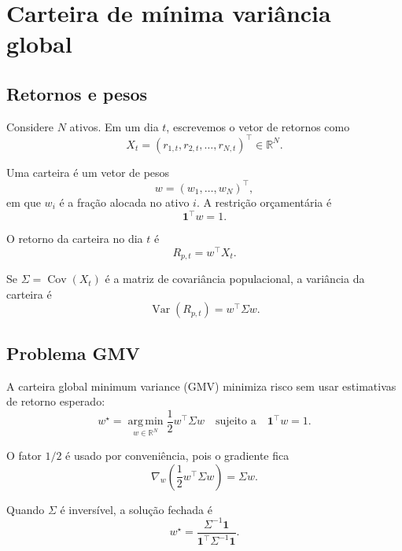 \documentclass[12pt,a4paper]{article}
\newcommand{\R}{\mathbb{R}}
\newcommand{\Var}{\operatorname{Var}}
\newcommand{\Cov}{\operatorname{Cov}}
\newcommand{\argmin}{\operatorname*{arg\,min}}
\newcommand{\one}{\mathbf{1}}
\begin{document}
\section{Carteira de mínima variância global}

\subsection{Retornos e pesos}

Considere $N$ ativos. Em um dia $t$, escrevemos o vetor de retornos como
\begin{equation}
  X_t = (r_{1,t}, r_{2,t}, \dots, r_{N,t})^\top \in \R^N.
\end{equation}

Uma carteira é um vetor de pesos
\begin{equation}
  w = (w_1,\dots,w_N)^\top,
\end{equation}
em que $w_i$ é a fração alocada no ativo $i$. A restrição orçamentária é
\begin{equation}
  \one^\top w = 1.
\end{equation}

O retorno da carteira no dia $t$ é
\begin{equation}
  R_{p,t} = w^\top X_t.
\end{equation}

Se $\Sigma = \Cov(X_t)$ é a matriz de covariância populacional, a variância da carteira é
\begin{equation}
  \Var(R_{p,t}) = w^\top \Sigma w.
\end{equation}

\subsection{Problema GMV}

A carteira global minimum variance (GMV) minimiza risco sem usar estimativas de retorno
esperado:
\begin{equation}
  w^\star
  =
  \argmin_{w \in \R^N}
  \frac{1}{2} w^\top \Sigma w
  \quad \text{sujeito a} \quad
  \one^\top w = 1.
  \label{eq:gmv}
\end{equation}

O fator $1/2$ é usado por conveniência, pois o gradiente fica
\begin{equation}
  \nabla_w \left(\frac{1}{2}w^\top\Sigma w\right)
  =
  \Sigma w.
\end{equation}

Quando $\Sigma$ é inversível, a solução fechada é
\begin{equation}
  w^\star =
  \frac{\Sigma^{-1}\one}{\one^\top \Sigma^{-1}\one}.
  \label{eq:gmv_closed}
\end{equation}
\end{document}
